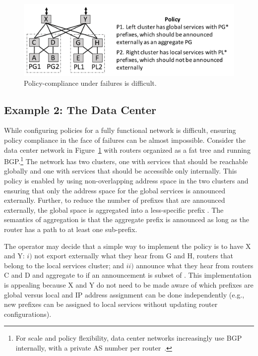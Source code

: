 \begin{figure}[t!]
\centering
\includegraphics[width=\columnwidth]{figures/example2}
\caption{Policy-compliance under failures is difficult.}
\label{fig:example2}
\end{figure}

\subsection{Example 2:  The Data Center}

 While configuring policies for a fully functional network is difficult, ensuring policy compliance in the face of failures can be almost impossible. Consider the data center network in Figure~\ref{fig:example2} with routers organized as a fat tree and running BGP.\footnote{For scale and policy flexibility, data center networks increasingly use BGP internally, with a private AS number per router~\cite{bgp-in-dc}.} The network has two clusters, one with services that should be reachable globally and one with services that should be accessible only internally. This policy is enabled by using non-overlapping address space in the two clusters and ensuring that only the address space for the global services is announced externally. Further, to reduce the number of prefixes that are announced externally, the global space is aggregated into a less-specific prefix . The semantics of aggregation is that the aggregate prefix is announced as long as the router has a path to at least one sub-prefix.

The operator may decide that a simple way to implement the policy is to have X and Y: $i)$ not export externally what they hear from G and H, routers that belong to the local services cluster; and $ii)$ announce what they hear from routers C and D and aggregate to  if an announcement is subset of . This implementation is appealing because X and Y do not need to be made aware of which prefixes are global versus local and IP address assignment can be done independently (e.g., new prefixes can be assigned to local services without updating router configurations).

